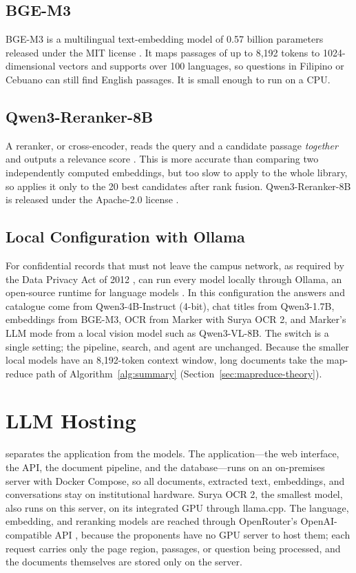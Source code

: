 \subsection{BGE-M3}

BGE-M3 is a multilingual text-embedding model of 0.57 billion parameters released under the MIT license \citep{chen2024bgem3}. It maps passages of up to 8,192 tokens to 1024-dimensional vectors and supports over 100 languages, so questions in Filipino or Cebuano can still find English passages. It is small enough to run on a CPU.

\subsection{Qwen3-Reranker-8B}

A reranker, or cross-encoder, reads the query and a candidate passage \emph{together} and outputs a relevance score \citep{nogueira2019}. This is more accurate than comparing two independently computed embeddings, but too slow to apply to the whole library, so \cs{} applies it only to the 20 best candidates after rank fusion. Qwen3-Reranker-8B is released under the Apache-2.0 license \citep{qwen3reranker2025}.

\subsection{Local Configuration with Ollama}\label{sec:local-mode}

For confidential records that must not leave the campus network, as required by the Data Privacy Act of 2012 \citep{dpa2012}, \cs{} can run every model locally through Ollama, an open-source runtime for language models \citep{ollama2024}. In this configuration the answers and catalogue come from Qwen3-4B-Instruct (4-bit), chat titles from Qwen3-1.7B, embeddings from BGE-M3, OCR from Marker with Surya OCR 2, and Marker's LLM mode from a local vision model such as Qwen3-VL-8B. The switch is a single setting; the pipeline, search, and agent are unchanged. Because the smaller local models have an 8,192-token context window, long documents take the map-reduce path of Algorithm~\ref{alg:summary} (Section~\ref{sec:mapreduce-theory}).

\section{LLM Hosting}\label{sec:hosting}

\cs{} separates the application from the models. The application---the web interface, the API, the document pipeline, and the database---runs on an on-premises server with Docker Compose, so all documents, extracted text, embeddings, and conversations stay on institutional hardware. Surya OCR 2, the smallest model, also runs on this server, on its integrated GPU through llama.cpp. The language, embedding, and reranking models are reached through OpenRouter's OpenAI-compatible API \citep{openrouter2026}, because the proponents have no GPU server to host them; each request carries only the page region, passages, or question being processed, and the documents themselves are stored only on the server.

